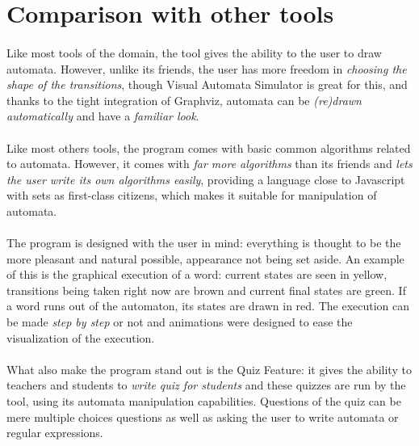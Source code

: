 \section{Comparison with other tools}

\paragraph{}
Like most tools of the domain, the tool gives the ability to the user to draw automata. However, unlike its friends, the user has more freedom in {\em choosing the shape of the transitions}, though Visual Automata Simulator is great for this, and thanks to the tight integration of Graphviz, automata can be {\em (re)drawn automatically} and have a {\em familiar look}.
   
   
\paragraph{}
Like most others tools, the program comes with basic common algorithms related to automata. However, it comes with {\em far more algorithms} than its friends and {\em lets the user write its own algorithms easily}, providing a language close to Javascript with sets as first-class citizens, which makes it suitable for manipulation of automata.

   
\paragraph{}
The program is designed with the user in mind: everything is thought to be the more pleasant and natural possible, appearance not being set aside. An example of this is the graphical execution of a word: current states are seen in yellow, transitions being taken right now are brown and current final states are green. If a word runs out of the automaton, its states are drawn in red. The execution can be made {\em step by step} or not and animations were designed to ease the visualization of the execution.

   
\paragraph{}
What also make the program stand out is the Quiz Feature: it gives the ability to teachers and students to {\em write quiz for students} and these quizzes are run by the tool, using its automata manipulation capabilities. Questions of the quiz can be mere multiple choices questions as well as asking the user to write automata or regular expressions.
   
